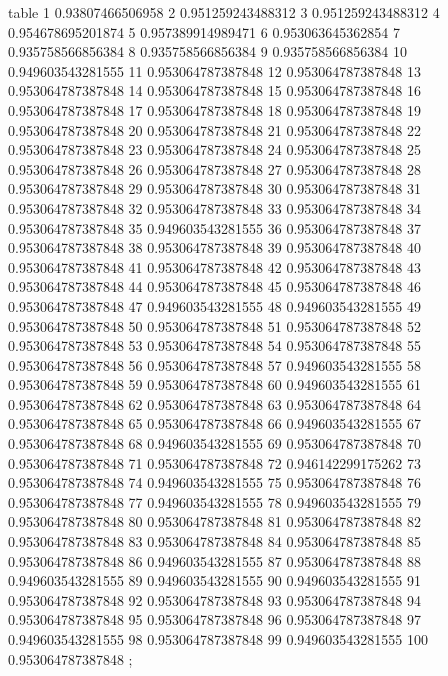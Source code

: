 table {%
	1 0.93807466506958
	2 0.951259243488312
	3 0.951259243488312
	4 0.954678695201874
	5 0.957389914989471
	6 0.953063645362854
	7 0.935758566856384
	8 0.935758566856384
	9 0.935758566856384
	10 0.949603543281555
	11 0.953064787387848
	12 0.953064787387848
	13 0.953064787387848
	14 0.953064787387848
	15 0.953064787387848
	16 0.953064787387848
	17 0.953064787387848
	18 0.953064787387848
	19 0.953064787387848
	20 0.953064787387848
	21 0.953064787387848
	22 0.953064787387848
	23 0.953064787387848
	24 0.953064787387848
	25 0.953064787387848
	26 0.953064787387848
	27 0.953064787387848
	28 0.953064787387848
	29 0.953064787387848
	30 0.953064787387848
	31 0.953064787387848
	32 0.953064787387848
	33 0.953064787387848
	34 0.953064787387848
	35 0.949603543281555
	36 0.953064787387848
	37 0.953064787387848
	38 0.953064787387848
	39 0.953064787387848
	40 0.953064787387848
	41 0.953064787387848
	42 0.953064787387848
	43 0.953064787387848
	44 0.953064787387848
	45 0.953064787387848
	46 0.953064787387848
	47 0.949603543281555
	48 0.949603543281555
	49 0.953064787387848
	50 0.953064787387848
	51 0.953064787387848
	52 0.953064787387848
	53 0.953064787387848
	54 0.953064787387848
	55 0.953064787387848
	56 0.953064787387848
	57 0.949603543281555
	58 0.953064787387848
	59 0.953064787387848
	60 0.949603543281555
	61 0.953064787387848
	62 0.953064787387848
	63 0.953064787387848
	64 0.953064787387848
	65 0.953064787387848
	66 0.949603543281555
	67 0.953064787387848
	68 0.949603543281555
	69 0.953064787387848
	70 0.953064787387848
	71 0.953064787387848
	72 0.946142299175262
	73 0.953064787387848
	74 0.949603543281555
	75 0.953064787387848
	76 0.953064787387848
	77 0.949603543281555
	78 0.949603543281555
	79 0.953064787387848
	80 0.953064787387848
	81 0.953064787387848
	82 0.953064787387848
	83 0.953064787387848
	84 0.953064787387848
	85 0.953064787387848
	86 0.949603543281555
	87 0.953064787387848
	88 0.949603543281555
	89 0.949603543281555
	90 0.949603543281555
	91 0.953064787387848
	92 0.953064787387848
	93 0.953064787387848
	94 0.953064787387848
	95 0.953064787387848
	96 0.953064787387848
	97 0.949603543281555
	98 0.953064787387848
	99 0.949603543281555
	100 0.953064787387848
};
